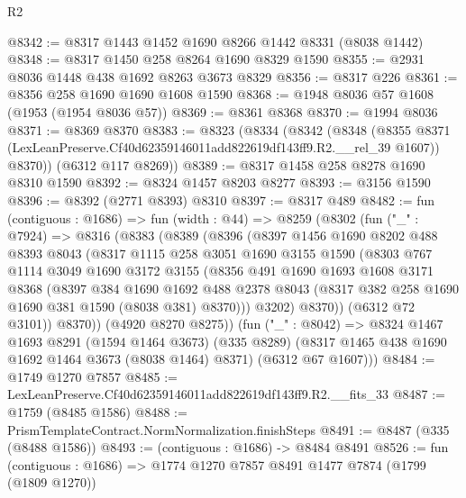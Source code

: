 \begin{lexlean}{R2}
\begin{coremodule}
@8342 := @8317 @1443 @1452 @1690 @8266 @1442 @8331 (@8038 @1442)
@8348 := @8317 @1450 @258 @8264 @1690 @8329 @1590
@8355 := @2931 @8036 @1448 @438 @1692 @8263 @3673 @8329
@8356 := @8317 @226
@8361 := @8356 @258 @1690 @1690 @1608 @1590
@8368 := @1948 @8036 @57 @1608 (@1953 (@1954 @8036 @57))
@8369 := @8361 @8368
@8370 := @1994 @8036
@8371 := @8369 @8370
@8383 := @8323
    (@8334
      (@8342
        (@8348
          (@8355 @8371 (LexLeanPreserve.Cf40d62359146011add822619df143ff9.R2.__rel_39 @1607))
          @8370))
      (@6312 @117 @8269))
@8389 := @8317 @1458 @258 @8278 @1690 @8310 @1590
@8392 := @8324 @1457 @8203 @8277
@8393 := @3156 @1590
@8396 := @8392 (@2771 @8393) @8310
@8397 := @8317 @489
@8482 := fun (contiguous : @1686) =>
  fun (width : @44) =>
  @8259
    (@8302
      (fun ("_" : @7924) =>
      @8316
        (@8383
          (@8389
            (@8396
              (@8397
                @1456
                @1690
                @8202
                @488
                @8393
                @8043
                (@8317
                  @1115
                  @258
                  @3051
                  @1690
                  @3155
                  @1590
                  (@8303
                    @767
                    @1114
                    @3049
                    @1690
                    @3172
                    @3155
                    (@8356
                      @491
                      @1690
                      @1693
                      @1608
                      @3171
                      @8368
                      (@8397
                        @384
                        @1690
                        @1692
                        @488
                        @2378
                        @8043
                        (@8317 @382 @258 @1690 @1690 @381 @1590 (@8038 @381) @8370)))
                    @3202)
                  @8370))
              (@6312 @72 @3101))
            @8370))
        (@4920 @8270 @8275))
      (fun ("_" : @8042) =>
      @8324
        @1467
        @1693
        @8291
        (@1594 @1464 @3673)
        (@335 @8289)
        (@8317 @1465 @438 @1690 @1692 @1464 @3673 (@8038 @1464) @8371)
        (@6312 @67 @1607)))
@8484 := @1749 @1270 @7857
@8485 := LexLeanPreserve.Cf40d62359146011add822619df143ff9.R2.__fits_33
@8487 := @1759 (@8485 @1586)
@8488 := PrismTemplateContract.NormNormalization.finishSteps
@8491 := @8487 (@335 (@8488 @1586))
@8493 := (contiguous : @1686) -> @8484 @8491
@8526 := fun (contiguous : @1686) =>
  @1774
    @1270
    @7857
    @8491
    @1477
    @7874
    (@1799 (@1809 @1270))

\end{coremodule}
\end{lexlean}

